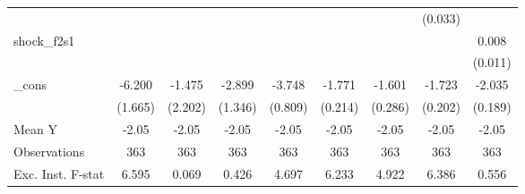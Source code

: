 {\begin{tabular}{l*{8}{c}}
            &                     &                     &                     &                     &                     &                     &     (0.033)         &                     \\
\addlinespace
shock\_f2s1  &                     &                     &                     &                     &                     &                     &                     &       0.008         \\
            &                     &                     &                     &                     &                     &                     &                     &     (0.011)         \\
\addlinespace
\_cons      &      -6.200\sym{***}&      -1.475         &      -2.899\sym{**} &      -3.748\sym{***}&      -1.771\sym{***}&      -1.601\sym{***}&      -1.723\sym{***}&      -2.035\sym{***}\\
            &     (1.665)         &     (2.202)         &     (1.346)         &     (0.809)         &     (0.214)         &     (0.286)         &     (0.202)         &     (0.189)         \\
\midrule
Mean Y      &       -2.05         &       -2.05         &       -2.05         &       -2.05         &       -2.05         &       -2.05         &       -2.05         &       -2.05         \\
Observations&         363         &         363         &         363         &         363         &         363         &         363         &         363         &         363         \\
Exc. Inst. F-stat&       6.595         &       0.069         &       0.426         &       4.697         &       6.233         &       4.922         &       6.386         &       0.556         \\
\bottomrule
\end{tabular}
}
